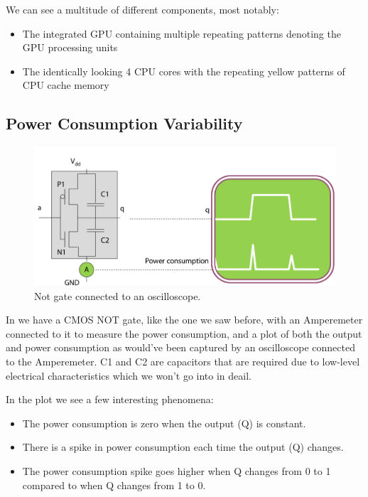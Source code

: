 We can see a multitude of different components, most notably:
\begin{itemize}
    \item The integrated GPU containing multiple repeating patterns denoting the GPU processing units
    \item The identically looking 4 CPU cores with the repeating yellow patterns of CPU cache memory
\end{itemize}

\subsection {Power Consumption Variability}

\begin{figure}[!ht]
    \centering
    \includegraphics[width=1.0\linewidth]{images/chapter4/not-gate-with-power-consumption-plot.png}
    \caption{Not gate connected to an oscilloscope.} \label{fig:Not gate connected to an oscilloscope}
\end{figure}

In  we have a CMOS NOT gate, like the one we saw before, with an Amperemeter connected to it to measure the power consumption, and a plot of both the output and power consumption as would've been captured by an oscilloscope connected to the Amperemeter.
C1 and C2 are capacitors that are required due to low-level electrical characteristics which we won't go into in deail.

In the plot we see a few interesting phenomena:
\begin{itemize}
    \item The power consumption is zero when the output (Q) is constant.
    \item There is a spike in power consumption each time the output (Q) changes.
    \item The power consumption spike goes higher when Q changes from 0 to 1 compared to when Q changes from 1 to 0.
\end{itemize}

